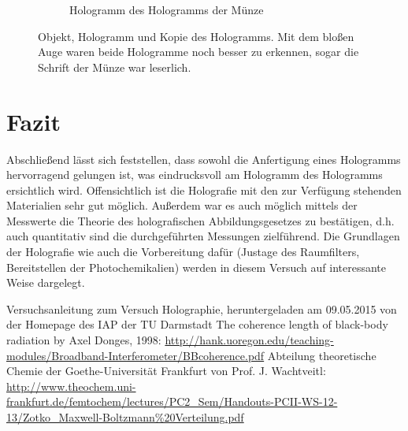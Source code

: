 \documentclass[bigchapter,colorback,accentcolor=tud4b,linedtoc,11pt]{tudreport}
\begin{document}
\begin{figure}[H]
\begin{subfigure}[h]{0.3\textwidth}
    \caption{Hologramm des Hologramms der Münze}
    \label{fig:gedenkholokopie}
  \end{subfigure}
  \caption{Objekt, Hologramm und Kopie des Hologramms. Mit dem bloßen Auge waren
  beide Hologramme noch besser zu erkennen, sogar die Schrift der Münze war leserlich.}\label{fig:genkhologramme}
\end{figure}


\chapter{Fazit}

Abschließend lässt sich feststellen, dass sowohl die Anfertigung eines Hologramms hervorragend gelungen ist, was eindrucksvoll am Hologramm des Hologramms ersichtlich wird. Offensichtlich ist die Holografie mit den zur Verfügung stehenden Materialien sehr gut möglich. Außerdem war es auch möglich mittels der Messwerte die Theorie des holografischen Abbildungsgesetzes zu bestätigen, d.h. auch quantitativ sind die durchgeführten Messungen zielführend. Die Grundlagen der Holografie wie auch die Vorbereitung dafür (Justage des Raumfilters, Bereitstellen der Photochemikalien) werden in diesem Versuch auf interessante Weise dargelegt.

\cleardoublepage{}
\newpage
\begin{thebibliography}{100}
   Versuchsanleitung zum Versuch Holographie, heruntergeladen am 09.05.2015 von der Homepage des IAP der TU Darmstadt
   The coherence length of black-body
radiation by Axel Donges, 1998: \url{http://hank.uoregon.edu/teaching-modules/Broadband-Interferometer/BBcoherence.pdf}
   Abteilung theoretische Chemie der Goethe-Universität
    Frankfurt von Prof. J. Wachtveitl: \url{http://www.theochem.uni-frankfurt.de/femtochem/lectures/PC2_Sem/Handouts-PCII-WS-12-13/Zotko_Maxwell-Boltzmann%20Verteilung.pdf}
\end{thebibliography}
\end{document}
